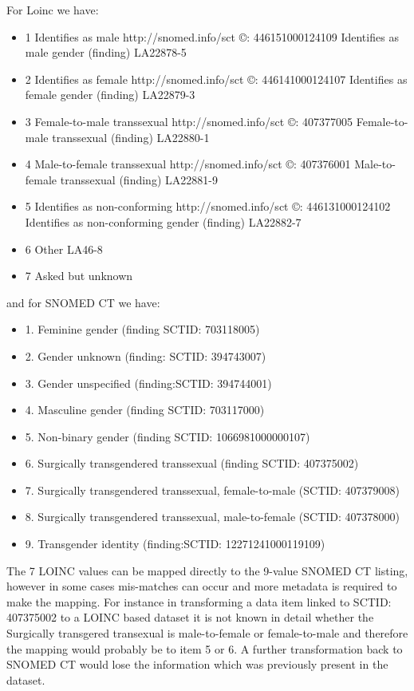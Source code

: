 \documentclass[runningheads]{llncs}
\begin{document}
For Loinc we have:
\begin{itemize}
	\item 1 Identifies as male http://snomed.info/sct ©: 446151000124109 Identifies as male gender (finding)  LA22878-5	 
	 \item 2    	 	Identifies as female http://snomed.info/sct ©: 446141000124107 Identifies as female gender (finding)    	 	LA22879-3	 
	 \item 3    	 	Female-to-male transsexual http://snomed.info/sct ©: 407377005 Female-to-male transsexual (finding)    	 	LA22880-1	 
	 \item 4    	 	Male-to-female transsexual http://snomed.info/sct ©: 407376001 Male-to-female transsexual (finding)    	 	LA22881-9	 
	 \item 5    	 	Identifies as non-conforming http://snomed.info/sct ©: 446131000124102 Identifies as non-conforming gender (finding)    	 	LA22882-7	 
	 \item 6    	 	Other    LA46-8	 
	 \item 7    	 	Asked but unknown    
\end{itemize}


and for SNOMED CT we have:
\begin{itemize}
	\item  1.	Feminine gender (finding SCTID: 703118005)
	\item  2.	Gender unknown (finding: SCTID: 394743007)
	\item  3.	Gender unspecified (finding:SCTID: 394744001)
	\item  4.	Masculine gender (finding SCTID: 703117000)
	\item  5.	Non-binary gender (finding SCTID: 1066981000000107)
	\item  6.	Surgically transgendered transsexual (finding SCTID: 407375002)
	\item  7.	Surgically transgendered transsexual, female-to-male (SCTID: 407379008)
	\item  8.	Surgically transgendered transsexual, male-to-female (SCTID: 407378000)
	\item  9.	Transgender identity (finding:SCTID: 12271241000119109)
\end{itemize}
The 7 LOINC values can be mapped directly to the 9-value SNOMED CT listing, however in some cases mis-matches can occur and more metadata is required to make the mapping. For instance in transforming a data item linked to SCTID: 407375002 to a LOINC based dataset it is not known in detail whether the Surgically transgered transexual is male-to-female or female-to-male and therefore the mapping would probably be to item 5 or 6. A further transformation back to SNOMED CT would lose the information which was previously present in the dataset.
\end{document}
